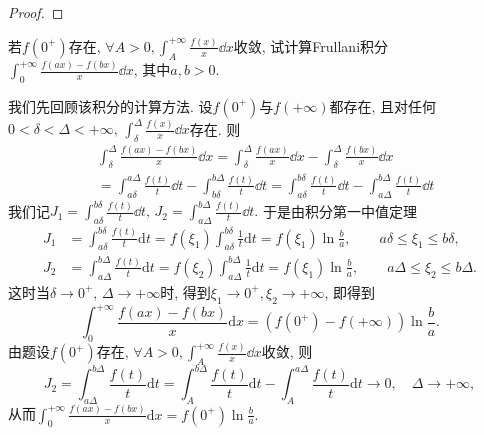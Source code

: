 \begin{quiza}
\begin{proof}
\end{proof}
\woe 若\(f(0^+)\)存在, \(\forall A>0,\int_{A}^{+\infty}\frac{f(x)}{x}\dd x\)收敛, 试计算Frullani积分\(\int_{0}^{+\infty}\frac{f(ax)-f(bx)}{x}\dd x\), 其中\(a,b>0\).
\begin{solution}
我们先回顾该积分的计算方法.
\tcbline
设\(f(0^+)\)与\(f(+\infty)\)都存在, 且对任何\(0<\delta<\varDelta<+\infty,\,\int_{\delta}^{\varDelta}\frac{f(x)}{x}\dd x\)存在. 则\[\begin{split}
&\int_{\delta}^{\varDelta}\frac{f(ax)-f(bx)}{x}\dd x=\int_{\delta}^{\varDelta}\frac{f(ax)}{x}\dd x-\int_{\delta}^{\varDelta}\frac{f(bx)}{x}\dd x\\
&=\int_{a\delta}^{a\varDelta}\frac{f(t)}{t}\dd t-\int_{b\delta}^{b\varDelta}\frac{f(t)}{t}\dd t=\int_{a\delta}^{b\delta}\frac{f(t)}{t}\dd t-\int_{a\varDelta}^{b\varDelta}\frac{f(t)}{t}\dd t
\end{split}\]我们记\(J_1=\int_{a\delta}^{b\delta}\frac{f(t)}{t}\dd t,\,J_2=\int_{a\varDelta}^{b\varDelta}\frac{f(t)}{t}\dd t.\) 于是由积分第一中值定理\[\begin{split}
J_1&=\int_{a\delta}^{b\delta}\frac{f(t)}{t}\mathrm{d}t=f(\xi_1)\int_{a\delta}^{b\delta}\frac{1}{t}\mathrm{d}t=f(\xi_1)\ln\frac{b}{a},\qquad a\delta\leqslant\xi_1\leqslant b\delta,\\
J_2&=\int_{a\varDelta}^{b\varDelta}\frac{f(t)}{t}\mathrm{d}t=f(\xi_2)\int_{a\varDelta}^{b\varDelta}\frac{1}{t}\mathrm{d}t=f(\xi_1)\ln\frac{b}{a},\qquad a\varDelta\leqslant\xi_2\leqslant b\varDelta.
\end{split}\]这时当\(\delta\rightarrow 0^+,\,\varDelta\rightarrow+\infty\)时, 得到\(\xi_1\rightarrow 0^+,\xi_2\rightarrow+\infty\), 即得到\[\int_0^{+\infty}\frac{f(ax)-f(bx)}{x}\mathrm{d}x=\left(f(0^+)-f(+\infty)\right)\ln\frac{b}{a}.\]
\tcbline
由题设\(f(0^+)\)存在, \(\forall A>0,\int_{A}^{+\infty}\frac{f(x)}{x}\dd x\)收敛, 则\[J_2=\int_{a\varDelta}^{b\varDelta}\frac{f(t)}{t}\mathrm{d}t=\int_{A}^{b\varDelta}\frac{f(t)}{t}\mathrm{d}t-\int_{A}^{a\varDelta}\frac{f(t)}{t}\mathrm{d}t\rightarrow 0,\quad\varDelta\rightarrow+\infty,\]从而\(\int_0^{+\infty}\frac{f(ax)-f(bx)}{x}\mathrm{d}x=f(0^+)\ln\frac{b}{a}.\)


\end{solution}
\end{quiza}
